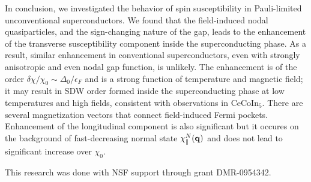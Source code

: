 \documentclass[aps,prl,twocolumn,showpacs,amsmath,amssymb]{revtex4-1}
\newcommand{\cecoin}{CeCoIn$_5$}
\begin{document}
In conclusion, we investigated the behavior of spin susceptibility in Pauli-limited 
unconventional superconductors. We found that the field-induced nodal quasiparticles, and the sign-changing 
nature of the gap, leads to the enhancement of the transverse susceptibility component 
inside the superconducting phase. 
As a result, similar enhancement in conventional superconductors, even with strongly anisotropic and even nodal 
gap function, is unlikely. 
The enhancement is of the order $\delta\chi/\chi_0 \sim \Delta_0/\epsilon_F$ 
and is a strong function of temperature and magnetic field; 
it may result in SDW order formed inside the superconducting phase at low temperatures and 
high fields, consistent with observations in \cecoin.  
There are several magnetization vectors that connect field-induced Fermi pockets. 
Enhancement of the longitudinal component is also significant but it occures on the 
background of fast-decreasing normal state $\chi_\parallel^N({\bf q})$ and does not lead to 
significant increase over $\chi_0$. 

This research was done with NSF support through grant DMR-0954342. 



\end{document}
